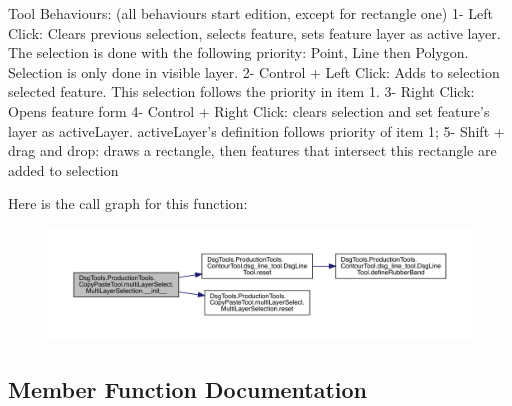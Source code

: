 \begin{DoxyVerb}Tool Behaviours: (all behaviours start edition, except for rectangle one)
1- Left Click: Clears previous selection, selects feature, sets feature layer as active layer. 
The selection is done with the following priority: Point, Line then Polygon. 
Selection is only done in visible layer.
2- Control + Left Click: Adds to selection selected feature. This selection follows the priority in item 1.
3- Right Click: Opens feature form
4- Control + Right Click: clears selection and set feature's layer as activeLayer. activeLayer's definition
follows priority of item 1;
5- Shift + drag and drop: draws a rectangle, then features that intersect this rectangle are added to selection
\end{DoxyVerb}
 Here is the call graph for this function\+:
\nopagebreak
\begin{figure}[H]
\begin{center}
\leavevmode
\includegraphics[width=350pt]{class_dsg_tools_1_1_production_tools_1_1_copy_paste_tool_1_1multi_layer_select_1_1_multi_layer_selection_af1893f0dfc914803738c1f865cf3d6a3_cgraph}
\end{center}
\end{figure}


\subsection{Member Function Documentation}
\mbox{\label{class_dsg_tools_1_1_production_tools_1_1_copy_paste_tool_1_1multi_layer_select_1_1_multi_layer_selection_a907b8aeeb7197817b2adddf3f7212bf5}} 
